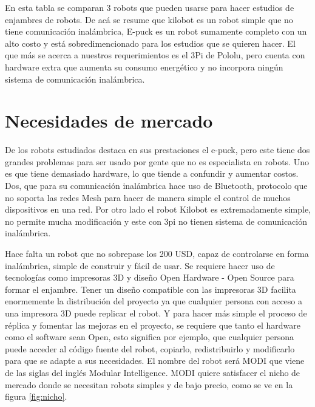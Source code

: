 En esta tabla se comparan 3 robots que pueden usarse para hacer estudios de enjambres de robots. De acá se resume que kilobot es un robot simple que no tiene comunicación inalámbrica, E-puck es un robot sumamente completo con un alto costo y está sobredimencionado para los estudios que se quieren hacer. El que más se acerca a nuestros requerimientos es el 3Pi de Pololu, pero cuenta con hardware extra que aumenta su consumo energético y no incorpora ningún sistema de comunicación inalámbrica.

\section{Necesidades de mercado}

De los robots estudiados destaca en sus prestaciones el e-puck, pero este tiene dos grandes problemas para ser usado por gente que no es especialista en robots. Uno es que tiene demasiado hardware, lo que tiende a confundir y aumentar costos. Dos, que para su comunicación inalámbrica hace uso de Bluetooth, protocolo que no soporta las redes Mesh para hacer de manera simple el control de muchos dispositivos en una red. Por otro lado el robot Kilobot es extremadamente simple, no permite mucha modificación y este con 3pi no tienen sistema de comunicación inalámbrica.

Hace falta un robot que no sobrepase los 200 USD, capaz de controlarse en forma inalámbrica, simple de construir y fácil de usar. Se requiere hacer uso de tecnologías como impresoras 3D y diseño Open Hardware - Open Source para formar el enjambre. Tener un diseño compatible con las impresoras 3D facilita enormemente la distribución del proyecto ya que cualquier persona con acceso a una impresora 3D puede replicar el robot. Y para hacer más simple el proceso de réplica y fomentar las mejoras en el proyecto, se requiere que tanto el hardware como el software sean Open, esto significa por ejemplo, que cualquier persona puede acceder al código fuente del robot, copiarlo, redistribuirlo y modificarlo para que se adapte a sus necesidades. El nombre del robot será MODI que viene de las siglas del inglés Modular Intelligence. MODI quiere satisfacer el nicho de mercado donde se necesitan robots simples y de bajo precio, como se ve en la figura \ref{fig:nicho}.

